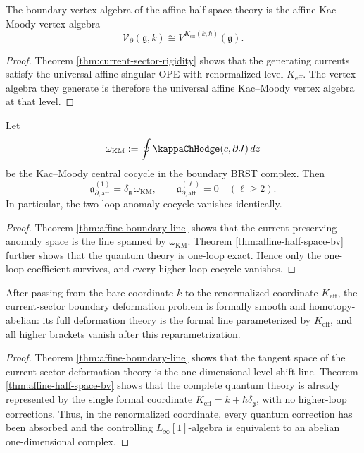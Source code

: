 \begin{corollary}\label{cor:boundary-affine-voa}
The boundary vertex algebra of the affine half-space theory is the affine Kac--Moody vertex algebra
\[
\mathcal V_{\partial}(\mathfrak g,k) \cong V^{K_{\mathrm{eff}}(k,\hbar)}(\mathfrak g).
\]
\end{corollary}

\begin{proof}
Theorem \ref{thm:current-sector-rigidity} shows that the generating currents satisfy the universal affine
singular OPE with renormalized level $K_{\mathrm{eff}}$. The vertex algebra they generate is therefore the universal
affine Kac--Moody vertex algebra at that level.
\end{proof}

\begin{corollary}\label{cor:loop-cocycles-affine}
Let
\[
\omega_{\mathrm{KM}} := \oint \kappaChHodge(c,\partial J)\,dz
\]
be the Kac--Moody central cocycle in the boundary BRST complex. Then
\[
\mathfrak a^{(1)}_{\partial,\mathrm{aff}} = \delta_{\mathfrak g}\,\omega_{\mathrm{KM}},
\qquad
\mathfrak a^{(\ell)}_{\partial,\mathrm{aff}}=0\quad (\ell\ge 2).
\]
In particular, the two-loop anomaly cocycle vanishes identically.
\end{corollary}

\begin{proof}
Theorem \ref{thm:affine-boundary-line} shows that the current-preserving anomaly space is the line spanned by
$\omega_{\mathrm{KM}}$. Theorem \ref{thm:affine-half-space-bv} further shows that the quantum theory is one-loop exact.
Hence only the one-loop coefficient survives, and every higher-loop cocycle vanishes.
\end{proof}

\begin{corollary}\label{cor:homotopy-abelian-line}
After passing from the bare coordinate $k$ to the renormalized coordinate $K_{\mathrm{eff}}$, the
current-sector boundary deformation problem is formally smooth and homotopy-abelian:
its full deformation theory is the formal line parameterized by $K_{\mathrm{eff}}$, and all higher brackets vanish
after this reparametrization.
\end{corollary}

\begin{proof}
Theorem \ref{thm:affine-boundary-line} shows that the tangent space of the current-sector deformation theory is
the one-dimensional level-shift line. Theorem \ref{thm:affine-half-space-bv} shows that the complete quantum
theory is already represented by the single formal coordinate $K_{\mathrm{eff}}=k+\hbar\delta_{\mathfrak g}$, with no
higher-loop corrections. Thus, in the renormalized coordinate, every quantum correction has been absorbed and
the controlling $L_{\infty}[1]$-algebra is equivalent to an abelian one-dimensional complex.
\end{proof}

